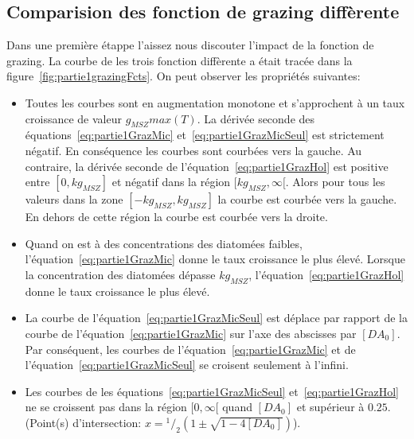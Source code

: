 {\subsection{Comparision des fonction de grazing diffèrente}

\par{
Dans une première étappe l'aissez nous discouter l'impact de la fonction de grazing. La courbe de les
trois fonction diffèrente a était tracée dans la figure~\ref{fig:partie1grazingFcts}.
On peut observer les propriétés suivantes:
}
\begin{itemize}
  \item Toutes les courbes sont en augmentation monotone et s'approchent à un taux croissance de valeur
$g_{MSZ} max(T)$. La dérivée seconde des équations~\ref{eq:partie1GrazMic} et~\ref{eq:partie1GrazMicSeul}
est strictement négatif. En conséquence les courbes sont courbées vers la gauche. Au contraire, la
dérivée seconde de l'équation~\ref{eq:partie1GrazHol} est positive entre $[0, kg_{MSZ}]$
et négatif dans la région $[kg_{MSZ}, \infty[$. Alors pour tous les valeurs dans la zone $[-kg_{MSZ},kg_{MSZ}]$
la courbe est courbée vers la gauche. En dehors de cette région la courbe est courbée vers la droite.
  \item Quand on est à des concentrations des diatomées faibles, l'équation~\ref{eq:partie1GrazMic}
donne le taux croissance le plus élevé. Lorsque la concentration des diatomées dépasse $kg_{MSZ}$,
l'équation~\ref{eq:partie1GrazHol} donne le taux croissance le plus élevé.
  \item La courbe de l'équation~\ref{eq:partie1GrazMicSeul} est déplace par rapport de la
courbe de l'équation~\ref{eq:partie1GrazMic} sur l'axe des abscisses par $[DA_0]$. Par conséquent,
les courbes de l'équation~\ref{eq:partie1GrazMic} et de l'équation~\ref{eq:partie1GrazMicSeul}
se croisent seulement à l'infini.
  \item Les courbes de les équations~\ref{eq:partie1GrazMicSeul} et~\ref{eq:partie1GrazHol}
ne se croissent pas dans la région $[0, \infty[$ quand $[DA_0]$ et supérieur à $0.25$.
(Point(s) d'intersection: $x = {^1/_2} \left ( 1 \pm \sqrt{1 - 4 [DA_0]}\right )$).
\end{itemize}

}
